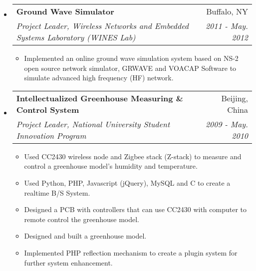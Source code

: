 \documentclass[a4paper, 11pt]{article}
\makeatletter
\newcommand{\resitem}[1]{\item #1 \vspace{-2pt}}
\newcommand{\ressubheading}[4]{
\begin{tabular*}{6.5in}{l@{\extracolsep{\fill}}r}
		\textbf{#1} & #2 \\
		\textit{#3} & \textit{#4} \\
\end{tabular*}\vspace{-6pt}}
\makeatother
\begin{document}
\begin{itemize}
	
\item
	\ressubheading{Ground Wave Simulator}{Buffalo, NY}{Project Leader, Wireless Networks and Embedded Systems Laboratory (WINES Lab)}{2011 - May. 2012}
	\begin{itemize}
		\resitem{Implemented an online ground wave simulation system based on NS-2 open source network simulator, GRWAVE and VOACAP Software to simulate advanced high frequency (HF) network.}
	\end{itemize}
	
	
\item
	\ressubheading{Intellectualized Greenhouse Measuring \& Control System}{Beijing, China}{Project Leader, National University Student Innovation Program}{2009 - May. 2010}
	\begin{itemize}
		\resitem{Used CC2430 wireless node and Zigbee stack (Z-stack) to measure and control a greenhouse model's humidity and temperature.}
		\resitem{Used Python, PHP, Javascript (jQuery), MySQL and C to create a realtime B/S System.}
		\resitem{Designed a PCB with controllers that can use CC2430 with computer to remote control the greenhouse model.}
		\resitem{Designed and built a greenhouse model.}
		\resitem{Implemented PHP reflection mechanism to create a plugin system for further system enhancement.}
	\end{itemize}



\end{itemize}
\end{document}
